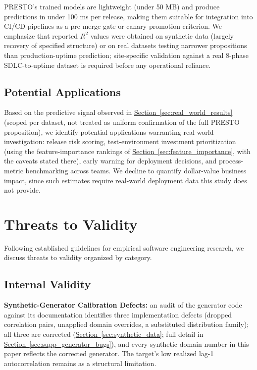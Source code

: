 \documentclass[technologies,article,submit,pdftex,moreauthors]{Definitions/mdpi}
\begin{document}
PRESTO's trained models are lightweight (under 50 MB) and produce predictions in under 100 ms per release, making them suitable for integration into CI/CD pipelines as a pre-merge gate or canary promotion criterion. We emphasize that reported \(R^2\) values were obtained on synthetic data (largely recovery of specified structure) or on real datasets testing narrower propositions than production-uptime prediction; site-specific validation against a real 8-phase SDLC-to-uptime dataset is required before any operational reliance.

\subsection{Potential Applications}\label{sec:applications}

Based on the predictive signal observed in \hyperref[sec:real_world_results]{Section~\ref*{sec:real_world_results}} (scoped per dataset, not treated as uniform confirmation of the full PRESTO proposition), we identify potential applications warranting real-world investigation: release risk scoring, test-environment investment prioritization (using the feature-importance rankings of \hyperref[sec:feature_importance]{Section~\ref*{sec:feature_importance}}, with the caveats stated there), early warning for deployment decisions, and process-metric benchmarking across teams. We decline to quantify dollar-value business impact, since such estimates require real-world deployment data this study does not provide.

\section{Threats to Validity}\label{sec:threats}

Following established guidelines for empirical software engineering research, we discuss threats to validity organized by category.

\subsection{Internal Validity}\label{sec:internal_validity}

\textbf{Synthetic-Generator Calibration Defects:} an audit of the generator code against its documentation identifies three implementation defects (dropped correlation pairs, unapplied domain overrides, a substituted distribution family); all three are corrected (\hyperref[sec:synthetic_data]{Section~\ref*{sec:synthetic_data}}; full detail in \hyperref[sec:supp_generator_bugs]{Section~\ref*{sec:supp_generator_bugs}}), and every synthetic-domain number in this paper reflects the corrected generator. The target's low realized lag-1 autocorrelation remains as a structural limitation.
\end{document}
